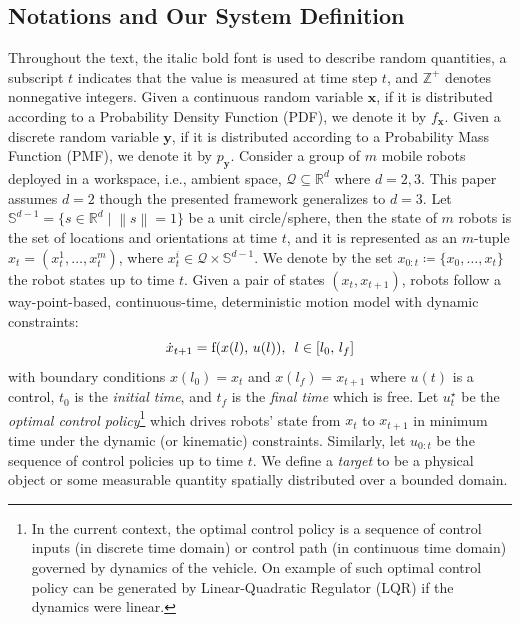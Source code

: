 \documentclass[letterpaper, 10 pt, conference]{ieeeconf}
\begin{document}
\subsection{Notations and Our System Definition}
\label{sec:sec21}
Throughout the text, the italic bold font is used to describe random quantities, a subscript $t$ indicates that the value is measured at time step $t$, and $\mathbb{Z}^{+}$ denotes nonnegative integers. %
Given a continuous random variable $\bm{x}$, if it is distributed according to a Probability Density Function (PDF), we denote it by $f_{\bm{x}}$.
Given a discrete random variable $\bm{y}$, if it is distributed according to a Probability Mass Function (PMF), we denote it by $p_{\bm{y}}$.
Consider a group of $m$ mobile robots deployed in a workspace, i.e., ambient space, $\mathcal{Q} \subseteq \mathbb{R}^d$ where $d = 2,3$. 
This paper assumes $d=2$ though the presented framework generalizes to $d=3$. 
Let $\mathbb{S}^{d-1} = \lbrace s\in \mathbb{R}^d\mid \left\| s \right\|=1 \rbrace$ be a unit circle/sphere, then the state of $m$ robots is the set of locations and orientations at time $t$, and it is represented as an $m$-tuple $x_t = (x_t^1,\dots,x_t^m)$, where $x_t^i \in \mathcal{Q} \times \mathbb{S}^{d-1}$. We denote by the set ${x}_{0:t}\coloneqq \lbrace {x}_0,\dots,{x}_t \rbrace$ the robot states up to time $t$. 
Given a pair of states $(x_t,x_{t+1})$, robots follow a way-point-based, continuous-time, deterministic motion model with dynamic constraints:
\begin{equation}
\dot{x}_{t+1} = \textup{f}(x(l),\,u(l)), \,\,\, l \in [l_0,\,l_f]
\label{eq:constraint}
\end{equation}
with boundary conditions $x(l_0) = x_t$ and $x(l_f) = x_{t+1}$ where $u(t)$ is a control, $t_0$ is the \emph{initial time}, and $t_f$ is the \emph{final time} which is free. 
Let $u_t^{\star}$ be the \emph{optimal control policy}\footnote{In the current context, the optimal control policy is a sequence of control inputs (in discrete time domain) or control path (in continuous time domain) governed by dynamics of the vehicle. On example of such optimal control policy can be generated by Linear-Quadratic Regulator (LQR) if the dynamics were linear.} which drives robots' state from $x_t$ to $x_{t+1}$ in minimum time under the dynamic (or kinematic) constraints. Similarly, let $u_{0:t}$ be the sequence of control policies up to time $t$.
We define a \emph{target} to be a physical object or some measurable quantity spatially distributed over a bounded domain.
\end{document}
